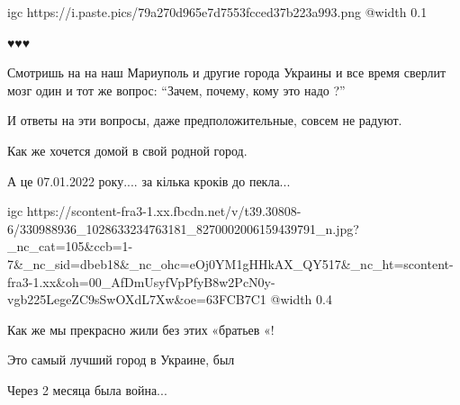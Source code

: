  
 
 
 
 

\qqSecCmt


\ifcmt
  igc https://i.paste.pics/79a270d965e7d7553fcced37b223a993.png
	@width 0.1
\fi


♥️♥️♥️


Смотришь на на наш Мариуполь и другие города Украины и все время сверлит мозг
один и тот же вопрос: \enquote{Зачем, почему, кому это надо ?}

\begin{itemize} %

И ответы на эти вопросы, даже предположительные, совсем не радуют.
\end{itemize} %


Как же хочется домой в свой родной город.


А це 07.01.2022 року.... за кілька кроків до пекла...

\ifcmt
  igc https://scontent-fra3-1.xx.fbcdn.net/v/t39.30808-6/330988936_1028633234763181_8270002006159439791_n.jpg?_nc_cat=105&ccb=1-7&_nc_sid=dbeb18&_nc_ohc=eOj0YM1gHHkAX_QY517&_nc_ht=scontent-fra3-1.xx&oh=00_AfDmUsyfVpPfyB8w2PcN0y-vgb225LegeZC9sSwOXdL7Xw&oe=63FCB7C1
	@width 0.4
\fi


Как же мы прекрасно жили без этих «братьев «!


Это самый лучший город в Украине, был


Через 2 месяца была война...
